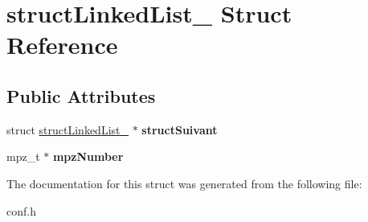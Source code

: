 \hypertarget{structstructLinkedList__}{
\section{structLinkedList\_\- Struct Reference}
\label{structstructLinkedList__}
}
\subsection*{Public Attributes}
\begin{DoxyCompactItemize}
\item 
\hypertarget{structstructLinkedList___ab13f8b8e57710ba670e20363b5ea86a8}{
struct \hyperlink{structstructLinkedList__}{structLinkedList\_\-} $\ast$ {\bfseries structSuivant}}
\label{structstructLinkedList___ab13f8b8e57710ba670e20363b5ea86a8}

\item 
\hypertarget{structstructLinkedList___abfce5ee3f4552f832d826e9cdc709393}{
mpz\_\-t $\ast$ {\bfseries mpzNumber}}
\label{structstructLinkedList___abfce5ee3f4552f832d826e9cdc709393}

\end{DoxyCompactItemize}


The documentation for this struct was generated from the following file:\begin{DoxyCompactItemize}
\item 
conf.h\end{DoxyCompactItemize}
